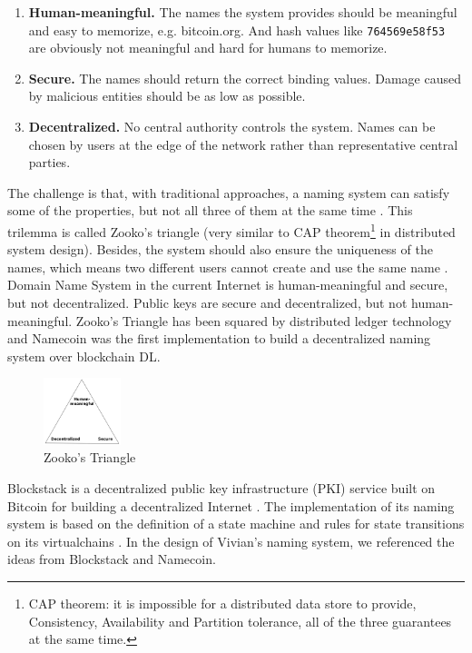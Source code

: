 \begin{enumerate}
    \item \textbf{Human-meaningful.} The names the system provides should be meaningful and easy to memorize, e.g. bitcoin.org. And hash values like \texttt{764569e58f53} are obviously not meaningful and hard for humans to memorize.
    \item \textbf{Secure.} The names should return the correct binding values. Damage caused by malicious entities should be as low  as possible.
    \item \textbf{Decentralized.} No central authority controls the system. Names can be chosen by users at the edge of the network rather than representative central parties.
\end{enumerate}

The challenge is that, with traditional approaches, a naming system can satisfy some of the properties, but not all three of them at the same time \cite{wilcox2001names}. This trilemma is called Zooko's triangle \cite{swartz_2011} (very similar to CAP theorem\footnote{CAP theorem: it is impossible for a distributed data store to provide, Consistency, Availability and Partition tolerance, all of the three guarantees at the same time.} in distributed system design).
Besides, the system should also ensure the uniqueness of the names, which means two different users cannot create and use the same name \cite{ali2017blockstack}.
Domain Name System in the current Internet is human-meaningful and secure, but not decentralized. Public keys are secure and decentralized, but not human-meaningful.
Zooko's Triangle has been squared by distributed ledger technology \cite{swartz_2011} and Namecoin was the first implementation to build a decentralized naming system over blockchain DL.

\begin{figure}[h]
    \centering
    \includegraphics[width=0.2\textwidth,trim={0 0 0 0},clip]{figs/zooko_triangle.png}
    \caption{Zooko's Triangle}
    \label{fig:zooko_triangle}
\end{figure}

Blockstack is a decentralized public key infrastructure (PKI) service built on Bitcoin for building a decentralized Internet \cite{ali2017blockstack}.
The implementation of its naming system is based on the definition of a state machine and rules for state transitions on its virtualchains \cite{nelson2016extending, ali2016blockstack}.
In the design of Vivian's naming system, we referenced the ideas from Blockstack and Namecoin.

